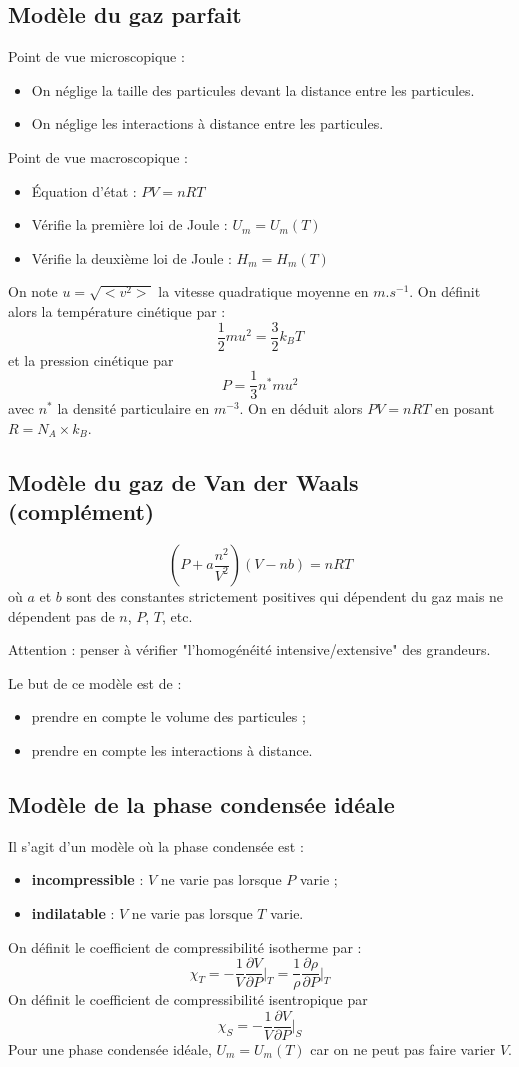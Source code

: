 \documentclass[french]{book}
\theoremstyle{plain}
\theoremstyle{definition}
\theoremstyle{remark}
\newcommand{\st}{^*}
\newcommand{\inv}{^{-1}}
\begin{document}
\subsection{Modèle du gaz parfait}
Point de vue microscopique :
\begin{itemize}
	\item On néglige la taille des particules devant la distance entre les particules.
	\item On néglige les interactions à distance entre les particules.
\end{itemize} \par 
Point de vue macroscopique : 
\begin{itemize}
	\item Équation d'état : $PV=nRT$
	\item Vérifie la première loi de Joule : $U_m=U_m(T)$
	\item Vérifie la deuxième loi de Joule : $H_m=H_m(T)$
\end{itemize}
On note $u=\sqrt{<v^2>}$ la vitesse quadratique moyenne en $m.s\inv$. On définit alors la température cinétique par : $$\frac{1}{2}mu^2=\frac32 k_BT$$ et la pression cinétique par $$P=\frac13n\st mu^2$$ avec $n\st$ la densité particulaire en $m^{-3}$. On en déduit alors $PV=nRT$ en posant $R=N_A\times k_B$.
\subsection{Modèle du gaz de Van der Waals (complément)}
$$\left(P+a\frac{n^2}{V^2}\right)\left(V-nb\right)=nRT$$ où $a$ et $b$ sont des constantes strictement positives qui dépendent du gaz mais ne dépendent pas de $n$, $P$, $T$, etc. \\ \par 
Attention : penser à vérifier "l'homogénéité intensive/extensive" des grandeurs. \\ \par 
Le but de ce modèle est de :
\begin{itemize}
	\item prendre en compte le volume des particules ;
	\item prendre en compte les interactions à distance.
\end{itemize}
\subsection{Modèle de la phase condensée idéale}
Il s'agit d'un modèle où la phase condensée est :
\begin{itemize}
	\item \textbf{incompressible} : $V$ ne varie pas lorsque $P$ varie ; 
	\item \textbf{indilatable} : $V$ ne varie pas lorsque $T$ varie.
\end{itemize}  \par  On définit le coefficient de compressibilité isotherme par : $$\chi_T=-\frac{1}{V}\frac{\partial V}{\partial P}\bigg\rvert_T=\frac{1}{\rho}\frac{\partial \rho}{\partial P}\bigg\rvert_T$$ On définit le coefficient de compressibilité isentropique par $$\chi_S=-\frac{1}{V}\frac{\partial V}{\partial P}\bigg\rvert_S$$ Pour une phase condensée idéale, $U_m=U_m(T)$ car on ne peut pas faire varier $V$.
\end{document}
